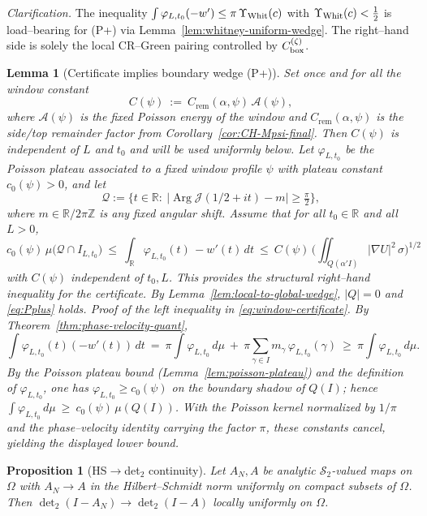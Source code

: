 \documentclass[11pt]{article}
\newtheorem{proposition}[theorem]{Proposition}
\newtheorem{lemma}[theorem]{Lemma}
\theoremstyle{definition}
\theoremstyle{remark}
\newcommand{\HS}{\mathcal{S}_2}
\DeclareMathOperator{\Arg}{Arg}
\begin{document}
\noindent\emph{Clarification.} The inequality $\int \varphi_{L,t_0}(-w') \le \pi\,\Upsilon_{\rm Whit}(c)$ with $\Upsilon_{\rm Whit}(c)<\tfrac12$ is load–bearing for \textup{(P+)} via Lemma~\ref{lem:whitney-uniform-wedge}. The right–hand side is solely the local CR–Green pairing controlled by $C_{\rm box}^{(\zeta)}$.
\begin{lemma}[Certificate implies boundary wedge (P+)]\label{lem:window-to-wedge}
Set once and for all the window constant
\[
  C(\psi)\ :=\ C_{\mathrm{rem}}(\alpha,\psi)\,\mathcal A(\psi),
\]
where $\mathcal A(\psi)$ is the fixed Poisson energy of the window and $C_{\mathrm{rem}}(\alpha,\psi)$ is the side/top remainder factor from Corollary~\ref{cor:CH-Mpsi-final}. Then $C(\psi)$ is independent of $L$ and $t_0$ and will be used uniformly below.
Let $\varphi_{L,t_0}$ be the Poisson plateau associated to a fixed window profile $\psi$
with plateau constant $c_0(\psi)>0$, and let
\[
 \mathcal Q := \bigl\{t\in\mathbb R:\ |\Arg \mathcal J(1/2+it)-m|\ge \tfrac{\pi}{2}\bigr\},
\]
where $m\in\mathbb R/2\pi\mathbb Z$ is any fixed angular shift. Assume that for all $t_0\in\mathbb R$ and all $L>0$,
\begin{equation}\label{eq:window-certificate}
 c_0(\psi)\,\mu\big(\mathcal Q\cap I_{L,t_0}\big)\ \le\
 \int_{\mathbb R} \varphi_{L,t_0}(t)\,-w'(t)\,dt\
 \le\ C(\psi)\,\Big(\iint_{Q(\alpha'I)} |\nabla U|^2\,\sigma\Big)^{1/2}
\end{equation}
with $C(\psi)$ independent of $t_0,L$. This provides the structural right–hand inequality for the certificate. By Lemma~\ref{lem:local-to-global-wedge}, $|Q|=0$ and \eqref{eq:Pplus} holds.
\smallskip\noindent\emph{Proof of the left inequality in \eqref{eq:window-certificate}.} By Theorem~\ref{thm:phase-velocity-quant},
\[
  \int \varphi_{L,t_0}(t)(-w'(t))\,dt\ =\ \pi\!\int\!\varphi_{L,t_0}\,d\mu\ +\ \pi\sum_{\gamma\in I} m_\gamma\,\varphi_{L,t_0}(\gamma)\ \ge\ \pi\!\int\!\varphi_{L,t_0}\,d\mu.
\]
By the Poisson plateau bound (Lemma~\ref{lem:poisson-plateau}) and the definition of $\varphi_{L,t_0}$, one has $\varphi_{L,t_0}\ge c_0(\psi)$ on the boundary shadow of $Q(I)$; hence $\int \varphi_{L,t_0}\,d\mu\ \ge\ c_0(\psi)\,\mu(Q(I))$. With the Poisson kernel normalized by $1/\pi$ and the phase–velocity identity carrying the factor $\pi$, these constants cancel, yielding the displayed lower bound.
\end{lemma}
\begin{proposition}[HS$\to$det$_2$ continuity]\label{prop:hs-det2-continuity}
Let $A_N,A$ be analytic $\HS$-valued maps on $\Omega$ with $A_N\to A$ in the Hilbert–Schmidt norm uniformly on compact subsets of $\Omega$. Then $\det\nolimits_2(I-A_N)\to\det\nolimits_2(I-A)$ locally uniformly on $\Omega$.
\end{proposition}
\end{document}
